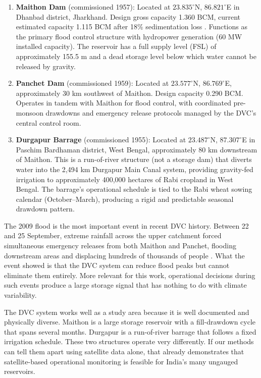 \documentclass[12pt,a4paper,oneside]{report}
\begin{document}
\begin{enumerate}[leftmargin=*]
  \item \textbf{Maithon Dam} (commissioned 1957): Located at
    $23.835^\circ$N, $86.821^\circ$E in Dhanbad district, Jharkhand. Design
    gross capacity 1.360 BCM, current estimated capacity 1.115 BCM after
    18\% sedimentation loss \citep{CWC2022}. Functions as the primary flood
    control structure with hydropower generation (60 MW installed capacity).
    The reservoir has a full supply level (FSL) of approximately 155.5 m and
    a dead storage level below which water cannot be released by gravity.

  \item \textbf{Panchet Dam} (commissioned 1959): Located at
    $23.577^\circ$N, $86.769^\circ$E, approximately 30 km southwest of
    Maithon. Design capacity 0.290 BCM. Operates in tandem with Maithon for
    flood control, with coordinated pre-monsoon drawdowns and emergency
    release protocols managed by the DVC's central control room.

  \item \textbf{Durgapur Barrage} (commissioned 1955): Located at
    $23.487^\circ$N, $87.307^\circ$E in Paschim Bardhaman district, West
    Bengal, approximately 80 km downstream of Maithon. This is a
    run-of-river structure (not a storage dam) that diverts water into the
    2,494 km Durgapur Main Canal system, providing gravity-fed irrigation to
    approximately 400,000 hectares of Rabi cropland in West Bengal. The
    barrage's operational schedule is tied to the Rabi wheat sowing calendar
    (October--March), producing a rigid and predictable seasonal drawdown
    pattern.
\end{enumerate}

The 2009 flood is the most important event in recent DVC history. Between
22 and 25 September, extreme rainfall across the upper catchment forced
simultaneous emergency releases from both Maithon and Panchet, flooding
downstream areas and displacing hundreds of thousands of people
\citep{Maiti2011}. What the event showed is that the DVC system can reduce
flood peaks but cannot eliminate them entirely. More relevant for this work,
operational decisions during such events produce a large storage signal that
has nothing to do with climate variability.

The DVC system works well as a study area because it is well documented and
physically diverse. Maithon is a large storage reservoir with a
fill-drawdown cycle that spans several months. Durgapur is a run-of-river
barrage that follows a fixed irrigation schedule. These two structures
operate very differently. If our methods can tell them apart using satellite
data alone, that already demonstrates that satellite-based operational
monitoring is feasible for India's many ungauged reservoirs.
\end{document}
